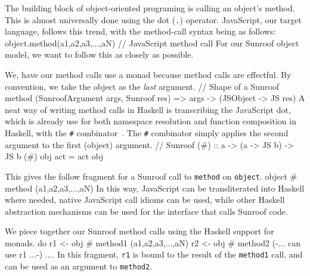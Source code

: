 \documentclass{llncs}
\newcommand{\Src}[1]{{\tt{#1}}}
\newenvironment{Code}{\verbatim}{\endverbatim}
\begin{document}
The building block of object-oriented programing is calling an object's method.
This is almost universally done using the dot (\Src{.}) operator. JavaScript, our target language, 
follows this trend, with the method-call syntax being as follows:
\begin{Code}
  object.method(a1,a2,a3,...,aN)   // JavaScript method call
\end{Code}
For our Sunroof object model, we want to follow this as closely as possible.

\newpage\noindent
We, have our method calls use a monad because method calls are effectful.
By convention, we take the object as the {\em last\/} argument.
\begin{Code}
// Shape of a Sunroof method
(SunroofArgument args, Sunroof res) => args -> (JSObject -> JS res)
\end{Code}
A neat way of writing method calls in Haskell is transcribing the JavaScript dot, which is already use
for both namespace resolution and function composition in Haskell, with the \Src{\#} combinator~\cite{Shields:01:Babel}.
The \Src{\#} combinator simply applies the second argument to the first (object) argument.
\begin{Code}
// Sunroof        
(#) :: a -> (a -> JS b) -> JS b
(#) obj act = act obj
\end{Code}

\noindent
This gives the follow fragment for a Sunroof call to \Src{method} on \Src{object}.
\begin{Code}
  object # method (a1,a2,a3,...,aN)
\end{Code}
In this way, JavaScript can be transliterated into Haskell where needed,
native JavaScript call idioms can be used,
while other Haskell abstraction mechanisms can be used for the interface that calls Sunroof code.

We piece together our Sunroof method calls using the Haskell support for monads.
\begin{Code}
  do r1 <- obj # method1 (a1,a2,a3,...,aN)
     r2 <- obj # method2 ({-... can use r1 ...-})
     ....
\end{Code} 
In this fragment, \Src{r1} is bound to the result of the \Src{method1} call,
and can be used as an argument to \Src{method2}.
\end{document}
